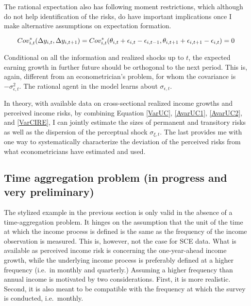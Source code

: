 \documentclass[12pt,notitlepage,onecolumn,aps,pra]{article}
\begin{document}
The rational expectation also has following moment restrictions, which
although do not help identification of the risks, do have important
implications once I make alternative assumptions on expectation
formation.

\begin{equation}
Cov^*_{i,t}( \Delta y_{i,t}, \Delta y_{i,t+1} ) \\
 = Cov^*_{i,t}(\theta_{i,t} + \epsilon_{i,t} - \epsilon_{i,t-1}, \theta_{i,t+1} + \epsilon_{i,t+1} - \epsilon_{i,t}) \\
 = 0 
\end{equation}

Conditional on all the information and realized shocks up to \(t\), the
expected earning growth in further future should be orthogonal to the
next period. This is, again, different from an econometrician's problem,
for whom the covariance is \(-\sigma^2_{\epsilon,t}\). The rational
agent in the model learns about \(\sigma_{\epsilon,t}\).

In theory, with available data on cross-sectional realized income
growths and perceived income risks, by combining Equation \ref{VarUC},
\ref{AvarUC1}, \ref{AvarUC2}, and \ref{VarCIRE}, I can jointly estimate
the sizes of permanent and transitory risks as well as the dispersion of
the perceptual shock \(\sigma_{\xi,t}\). The last provides me with one
way to systematically characterize the deviation of the perceived risks
from what econometricians have estimated and used.

    \hypertarget{time-aggregation-problem-in-progress-and-very-preliminary}{%
\subsection{Time aggregation problem (in progress and very
preliminary)}\label{time-aggregation-problem-in-progress-and-very-preliminary}}

The stylized example in the previous section is only valid in the
absence of a time-aggregation problem. It hinges on the assumption that
the unit of the time at which the income process is defined is the same
as the frequency of the income observation is measured. This is,
however, not the case for SCE data. What is available as perceived
income risk is concerning the one-year-ahead income growth, while the
underlying income process is preferably defined at a higher frequency
(i.e.~in monthly and quarterly.) Assuming a higher frequency than annual
income is motivated by two considerations. First, it is more realistic.
Second, it is also meant to be compatible with the frequency at which
the survey is conducted, i.e.~monthly.
\end{document}
